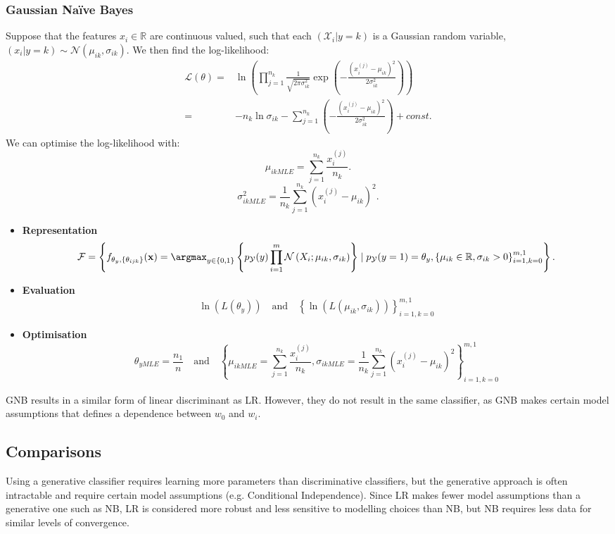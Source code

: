 \subsubsection{Gaussian Naïve Bayes}
Suppose that the features $x_i\in \mathbb{R}$ are continuous valued, such that
each $(\mathcal{X}_i|y=k)$ is a Gaussian random variable, $(x_i|y=k)\sim
\mathcal{N}\left( \mu_{ik},\sigma_{ik} \right) $. We then find the
log-likelihood:
\begin{align*}
  \mathcal{L}(\theta)=&\ln\left( \prod_{j=1}^{n_k} \frac{1}{\sqrt{2\pi\sigma_{ik}^{2}}}\exp\left(-\frac{{(x_i^{(j)}-\mu_{ik})}^{2}}{2\sigma_{ik}^{2}}\right)  \right) \\
  =&-n_k \ln\sigma_{ik}-\sum_{j=1}^{n_k} \left(-\frac{{(x_i^{(j)}-\mu_{ik})}^{2}}{2\sigma_{ik}^{2}}\right)+const.
\end{align*}
We can optimise the log-likelihood with:
\[\mu_{ikMLE}=\sum_{j=1}^{n_k} \frac{x_i^{(j)}}{n_k}.\] 
\[\sigma_{ikMLE}^{2}=\frac{1}{n_k}\sum_{j=1}^{n_k} {(x_i^{(j)}-\mu_{ik})}^{2}.\] 
\begin{itemize}
  \item \textbf{Representation}
    \[\mathcal{F}=\left\{ f_{\theta_y,\left\{ \theta_{ijk} \right\}} (\mathbf{x})=\argmax_{y\in \left\{ 0,1 \right\}} \left\{ p_\mathcal{Y}(y)\prod_{i=1}^{m} \mathcal{N}\left(X_i;\mu_{ik},\sigma_{ik}\right) \right\} \mid p_\mathcal{Y}(y=1)=\theta_y,{\left\{ \mu_{ik}\in \mathbb{R},\sigma_{ik}>0 \right\}}^{m,1}_{i=1,k=0} \right\}.\] 
  \item \textbf{Evaluation}
    \[\ln\left( L(\theta_y) \right)\quad\text{and}\quad {\left\{ \ln\left( L\left( \mu_{ik},\sigma_{ik}\right)  \right) \right\}}^{m,1}_{i=1,k=0}\] 
  \item \textbf{Optimisation}
    \[\theta_{yMLE}=\frac{n_1}{n}\quad\text{and}\quad {\left\{\mu_{ikMLE}=\sum_{j=1}^{n_k} \frac{x_i^{(j)}}{n_k},\sigma_{ikMLE}=\frac{1}{n_k}\sum_{j=1}^{n_k} {(x_i^{(j)}-\mu_{ik})}^{2} \right\}}^{m,1}_{i=1,k=0}\] 
\end{itemize}
\begin{remark}
  GNB results in a similar form of linear discriminant as LR\@. However, they do
  not result in the same classifier, as GNB makes certain model assumptions
  that defines a dependence between $w_0$ and $w_i$.
\end{remark}

\subsection{Comparisons}
Using a generative classifier requires learning more parameters than
discriminative classifiers, but the generative approach is often intractable
and require certain model assumptions (e.g. Conditional Independence). Since LR
makes fewer model assumptions than a generative one such as NB, LR is
considered more robust and less sensitive to modelling choices than NB, but NB
requires less data for similar levels of convergence.
